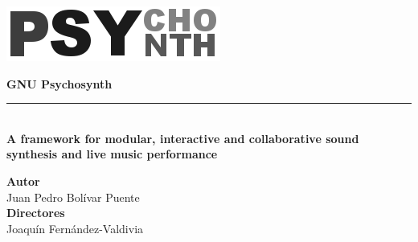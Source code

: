 
\begin{titlepage}
  
  \setlength{\centeroffset}{-0.5\oddsidemargin}
  \addtolength{\centeroffset}{0.5\evensidemargin}
  \thispagestyle{empty}


  \begin{minipage}{\textwidth}
    \centering
    \vspace{3.3cm}

    \includegraphics[width=.5\textwidth]{pic/logo-psynth.png} 
    \vspace{0.5cm}

    {\Huge\bfseries\sffamily GNU Psychosynth\\}
    \noindent\rule[-1ex]{\textwidth}{3pt}\\[3.5ex]
    {\large\bfseries A framework for modular,
      interactive and collaborative sound synthesis and live music
      performance\\[4cm]}
  \end{minipage}

  \vspace{2.5cm}
  
  \begin{minipage}{\textwidth}
    \centering

    \textbf{Autor}\\ {Juan Pedro Bolívar Puente}\\[2.5ex]
    \textbf{Directores}\\
    {Joaquín Fernández-Valdivia}\\[2cm]

  \end{minipage}

\end{titlepage}

